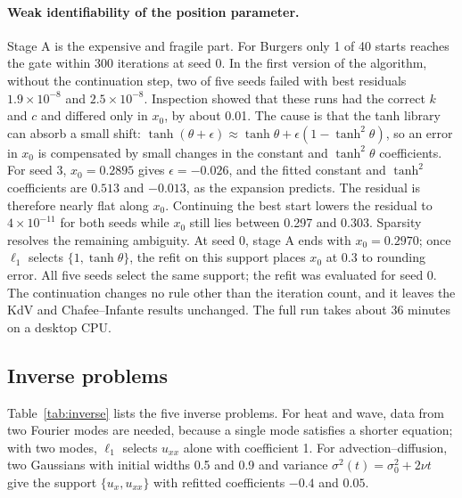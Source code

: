 \documentclass{article}
\begin{document}
\paragraph{Weak identifiability of the position parameter.}
Stage A is the expensive and fragile part. For Burgers only 1 of 40 starts reaches the gate within 300 iterations at seed 0. In the first version of the algorithm, without the continuation step, two of five seeds failed with best residuals $1.9\times10^{-8}$ and $2.5\times10^{-8}$. Inspection showed that these runs had the correct $k$ and $c$ and differed only in $x_0$, by about 0.01. The cause is that the tanh library can absorb a small shift: $\tanh(\theta + \epsilon) \approx \tanh\theta + \epsilon(1 - \tanh^2\theta)$, so an error in $x_0$ is compensated by small changes in the constant and $\tanh^2\theta$ coefficients. For seed 3, $x_0 = 0.2895$ gives $\epsilon = -0.026$, and the fitted constant and $\tanh^2$ coefficients are $0.513$ and $-0.013$, as the expansion predicts. The residual is therefore nearly flat along $x_0$. Continuing the best start lowers the residual to $4\times10^{-11}$ for both seeds while $x_0$ still lies between 0.297 and 0.303. Sparsity resolves the remaining ambiguity. At seed 0, stage A ends with $x_0 = 0.2970$; once $\ell_1$ selects $\{1, \tanh\theta\}$, the refit on this support places $x_0$ at 0.3 to rounding error. All five seeds select the same support; the refit was evaluated for seed 0. The continuation changes no rule other than the iteration count, and it leaves the KdV and Chafee--Infante results unchanged. The full run takes about 36 minutes on a desktop CPU.

\subsection{Inverse problems}
\label{sec:inverse}

Table~\ref{tab:inverse} lists the five inverse problems. For heat and wave, data from two Fourier modes are needed, because a single mode satisfies a shorter equation; with two modes, $\ell_1$ selects $u_{xx}$ alone with coefficient 1. For advection--diffusion, two Gaussians with initial widths 0.5 and 0.9 and variance $\sigma^2(t) = \sigma_0^2 + 2\nu t$ give the support $\{u_x, u_{xx}\}$ with refitted coefficients $-0.4$ and $0.05$.
\end{document}
